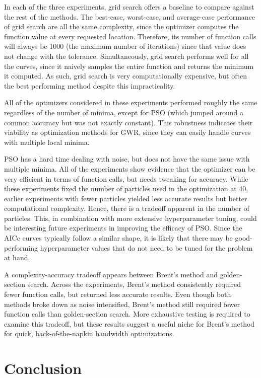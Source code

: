 \documentclass[letterpaper,12pt,twocolumn]{article}
\begin{document}
In each of the three experiments, grid search offers a baseline to compare against the rest of the methods. The best-case, worst-case, and average-case performance of grid search are all the same complexity, since the optimizer computes the function value at every requested location. Therefore, its number of function calls will always be 1000 (the maximum number of iterations) since that value does not change with the tolerance. Simultaneously, grid search performs well for all the curves, since it naively samples the entire function and returns the minimum it computed. As such, grid search is very computationally expensive, but often the best performing method despite this impracticality.

All of the optimizers considered in these experiments performed roughly the same regardless of the number of minima, except for PSO (which jumped around a common accuracy but was not exactly constant). This robustness indicates their viability as optimization methods for GWR, since they can easily handle curves with multiple local minima.

PSO has a hard time dealing with noise, but does not have the same issue with multiple minima. All of the experiments show evidence that the optimizer can be very efficient in terms of function calls, but needs tweaking for accuracy. While these experiments fixed the number of particles used in the optimization at 40, earlier experiments with fewer particles yielded less accurate results but better computational complexity. Hence, there is a tradeoff apparent in the number of particles. This, in combination with more extensive hyperparameter tuning, could be interesting future experiments in improving the efficacy of PSO. Since the AICc curves typically follow a similar shape, it is likely that there may be good-performing hyperparameter values that do not need to be tuned for the problem at hand.

A complexity-accuracy tradeoff appears between Brent's method and golden-section search. Across the experiments, Brent's method consistently required fewer function calls, but returned less accurate results. Even though both methods broke down as noise intensified, Brent's method still required fewer function calls than golden-section search. More exhaustive testing is required to examine this tradeoff, but these results suggest a useful niche for Brent's method for quick, back-of-the-napkin bandwidth optimizations.

\section{Conclusion}
\label{sec:conclusion}
\end{document}
